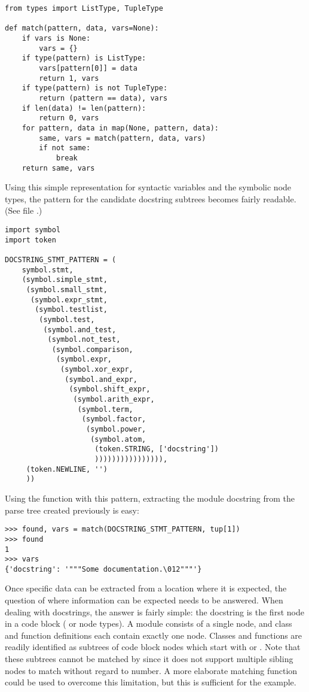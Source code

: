 \begin{verbatim}
from types import ListType, TupleType

def match(pattern, data, vars=None):
    if vars is None:
        vars = {}
    if type(pattern) is ListType:
        vars[pattern[0]] = data
        return 1, vars
    if type(pattern) is not TupleType:
        return (pattern == data), vars
    if len(data) != len(pattern):
        return 0, vars
    for pattern, data in map(None, pattern, data):
        same, vars = match(pattern, data, vars)
        if not same:
            break
    return same, vars
\end{verbatim}
%
Using this simple representation for syntactic variables and the symbolic
node types, the pattern for the candidate docstring subtrees becomes
fairly readable.  (See file .)

\begin{verbatim}
import symbol
import token

DOCSTRING_STMT_PATTERN = (
    symbol.stmt,
    (symbol.simple_stmt,
     (symbol.small_stmt,
      (symbol.expr_stmt,
       (symbol.testlist,
        (symbol.test,
         (symbol.and_test,
          (symbol.not_test,
           (symbol.comparison,
            (symbol.expr,
             (symbol.xor_expr,
              (symbol.and_expr,
               (symbol.shift_expr,
                (symbol.arith_expr,
                 (symbol.term,
                  (symbol.factor,
                   (symbol.power,
                    (symbol.atom,
                     (token.STRING, ['docstring'])
                     )))))))))))))))),
     (token.NEWLINE, '')
     ))
\end{verbatim}
%
Using the  function with this pattern, extracting the
module docstring from the parse tree created previously is easy:

\begin{verbatim}
>>> found, vars = match(DOCSTRING_STMT_PATTERN, tup[1])
>>> found
1
>>> vars
{'docstring': '"""Some documentation.\012"""'}
\end{verbatim}
%
Once specific data can be extracted from a location where it is
expected, the question of where information can be expected
needs to be answered.  When dealing with docstrings, the answer is
fairly simple: the docstring is the first  node in a code
block ( or  node types).  A module
consists of a single  node, and class and function
definitions each contain exactly one  node.  Classes and
functions are readily identified as subtrees of code block nodes which
start with  or
.  Note that these subtrees
cannot be matched by  since it does not support multiple
sibling nodes to match without regard to number.  A more elaborate
matching function could be used to overcome this limitation, but this
is sufficient for the example.

